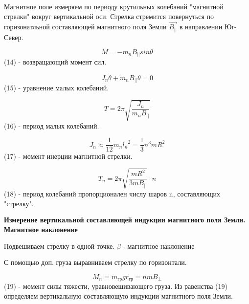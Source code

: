 \documentclass[a4paper,12pt]{article}
\begin{document}
Магнитное поле измеряем по периоду крутильных колебаний "магнитной стрелки" вокруг вертикальной оси. Стрелка стремится повернуться по горизонатльной составляющей магнитного поля Земли $\vec{B_{||}}$ в направлении Юг-Север. 


$$ M = -m_nB_{||}sin\theta $$ (14)  - возвращающий момент сил. 

$$ J_n{\ddot{\theta}} + m_nB_{||}\theta = 0 $$ (15) - уравнение малых колебаний. 

$$ T = 2\pi \sqrt{\frac{J_n}{m_nB_{||}}}  $$ (16) - период малых колебаний. 

$$ J_n \approx \frac{1}{12}m_n{l_n}^2 = \frac{1}{3}n^3mR^2  $$ (17) - момент инерции магнитной стрелки. 

$$ T_n = 2\pi\sqrt{\frac{mR^2}{3mB_{||}}} \cdot n $$ (18) - период колебаний пропорционален числу шаров n, составляющих "стрелку". 

\textbf{Измерение вертикальной составляющей индукции магнитного поля Земли. Магнитное наклонение}

Подвешиваем стрелку в одной точке. $\beta$ - магнитное наклонение

С помощью доп. груза выравниваем стрелку по горизонтали.  

$$ M_n = m_{гр}gr_{гр} = nmB_{\perp}  $$ (19) - момент силы тяжести, уравновешивающего груза. 
Из равенства (19) определяем вертикальную составляющую индукции магнитного поля Земли. 

\end{document}
